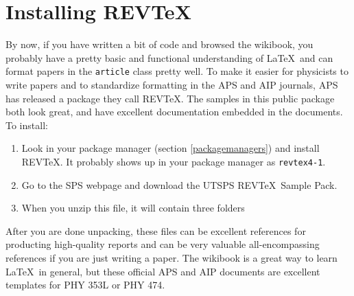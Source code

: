 \section{Installing REV\TeX}

By now, if you have written a bit of code and browsed the wikibook, you probably have a pretty basic and functional understanding of \LaTeX\ and can format papers in the \texttt{article} class pretty well. To make it easier for physicists to write papers and to standardize formatting in the APS and AIP journals, APS has released a package they call REV\TeX. The samples in this public package both look great, and have excellent documentation embedded in the documents. To install: \\

\begin{enumerate}
\item Look in your package manager (section \ref{packagemanagers}) and install REV\TeX. It probably shows up in your package manager as \texttt{revtex4-1}. 
\item Go to the SPS webpage and download the UTSPS REV\TeX\ Sample Pack.
\item When you unzip this file, it will contain three folders
\end{enumerate}
After you are done unpacking, these files can be excellent references for producting high-quality reports and can be very valuable all-encompassing references if you are just writing a paper. The wikibook is a great way to learn \LaTeX\ in general, but these official APS and AIP documents are excellent templates for PHY 353L or PHY 474.


